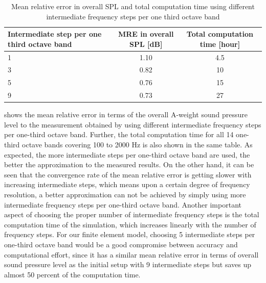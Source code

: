 \begin{table}[H]
	\caption{Mean relative error in overall SPL and total computation time using different intermediate frequency steps per one third octave band}
	\label{tab:freq_steps_MRE}
	\begin{tabularx}{\columnwidth}{|X|c|c|}
	\hline
	\textbf{Intermediate step per one third octave band} & \textbf{MRE in overall SPL {[}dB{]}} & \textbf{Total computation time {[}hour{]}} \\ \hline
	\hspace{65pt} 1                                                    & 1.10                                 & 4.5                                        \\ \hline
	\hspace{65pt} 3                                                    & 0.82                                 & 10                                         \\ \hline
	\hspace{65pt} 5                                                    & 0.76                                 & 15                                         \\ \hline
	\hspace{65pt} 9                                                    & 0.73                                 & 27                                         \\ \hline
	\end{tabularx}
\end{table}

\noindent{} shows the mean relative error in terms of the overall A-weight sound pressure level to the measurement obtained by using different intermediate frequency steps per one-third octave band. Further, the total computation time for all 14 one-third octave bands covering 100 to 2000 Hz is also shown in the same table. As expected, the more intermediate steps per one-third octave band are used, the better the approximation to the measured results. On the other hand, it can be seen that the convergence rate of the mean relative error is getting slower with increasing intermediate steps, which means upon a certain degree of frequency resolution, a better approximation can not be achieved by simply using more intermediate frequency steps per one-third octave band. Another important aspect of choosing the proper number of intermediate frequency steps is the total computation time of the simulation, which increases linearly with the number of frequency steps. For our finite element model, choosing 5 intermediate steps per one-third octave band would be a good compromise between accuracy and computational effort, since it has a similar mean relative error in terms of overall sound pressure level as the initial setup with 9 intermediate steps but saves up almost 50 percent of the computation time.

